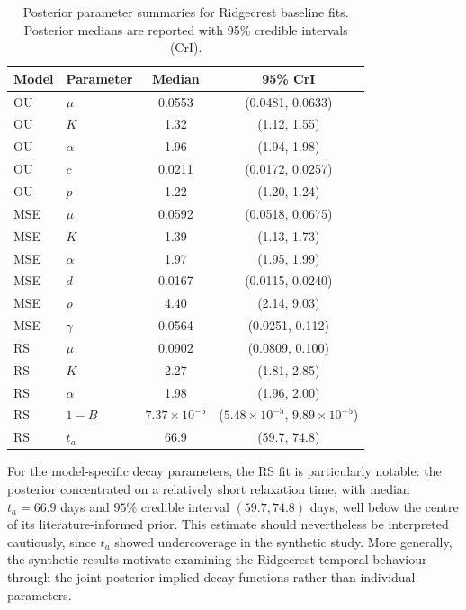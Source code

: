 \documentclass{statsmsc}
\begin{document}
\begin{table}[htbp]
\centering
\caption{Posterior parameter summaries for Ridgecrest baseline fits. Posterior medians are reported with 95\% credible intervals (CrI).}
\label{tab:ridgecrest-posterior}
\small
\begin{tabular}{llcc}
\hline
Model & Parameter & Median & 95\% CrI \\
\hline
OU  & $\mu$        & 0.0553 & (0.0481, 0.0633) \\
OU  & $K$          & 1.32   & (1.12, 1.55) \\
OU  & $\alpha$     & 1.96   & (1.94, 1.98) \\
OU  & $c$          & 0.0211 & (0.0172, 0.0257) \\
OU  & $p$          & 1.22   & (1.20, 1.24) \\
\hline
MSE & $\mu$        & 0.0592 & (0.0518, 0.0675) \\
MSE & $K$          & 1.39   & (1.13, 1.73) \\
MSE & $\alpha$     & 1.97   & (1.95, 1.99) \\
MSE & $d$          & 0.0167 & (0.0115, 0.0240) \\
MSE & $\rho$       & 4.40   & (2.14, 9.03) \\
MSE & $\gamma$     & 0.0564 & (0.0251, 0.112) \\
\hline
RS  & $\mu$        & 0.0902 & (0.0809, 0.100) \\
RS  & $K$          & 2.27   & (1.81, 2.85) \\
RS  & $\alpha$     & 1.98   & (1.96, 2.00) \\
RS  & $1-B$        & $7.37\times10^{-5}$ & ($5.48\times10^{-5}$, $9.89\times10^{-5}$) \\
RS  & $t_a$        & 66.9   & (59.7, 74.8) \\
\hline
\end{tabular}
\end{table}

For the model-specific decay parameters, the RS fit is particularly notable: the posterior concentrated on a relatively short relaxation time, with median $t_a = 66.9$ days and $95\%$ credible interval $(59.7, 74.8)$ days, well below the centre of its literature-informed prior. This estimate should nevertheless be interpreted cautiously, since $t_a$ showed undercoverage in the synthetic study. More generally, the synthetic results motivate examining the Ridgecrest temporal behaviour through the joint posterior-implied decay functions rather than individual parameters.
\end{document}
